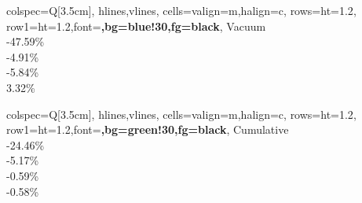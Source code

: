 \documentclass{article}
\begin{document}
\begin{center}
\begin{minipage}[t]{3.5cm}
\begin{tblr}{
				colspec={Q[3.5cm]},
				hlines,vlines,
				cells={valign=m,halign=c},
				rows={ht=1.2\baselineskip},
				row{1}={ht=1.2\baselineskip,font=\bfseries,bg=blue!30,fg=black},
			}
			Vacuum \\
			{-47.59\%} \\
			{-4.91\%} \\
			{-5.84\%} \\ 
			{3.32\%} \\ 
		\end{tblr}
	\end{minipage}
	\hspace{1em}
	\begin{minipage}[t]{3.5cm}
		\centering
		\begin{tblr}{
				colspec={Q[3.5cm]},
				hlines,vlines,
				cells={valign=m,halign=c},
				rows={ht=1.2\baselineskip},
				row{1}={ht=1.2\baselineskip,font=\bfseries,bg=green!30,fg=black},
			}
			Cumulative \\
			{-24.46\%} \\
			{-5.17\%} \\
			{-0.59\%} \\
			{-0.58\%} \
		\end{tblr}
	\end{minipage}	
\end{center}
\label{table:Percenterrors}
\vspace{1em}
\end{document}
